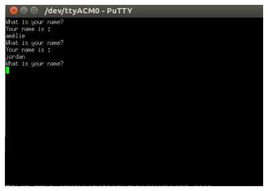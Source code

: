 \documentclass{article}
\begin{document}
\begin{figure}[H]
\begin{center}
\advance\leftskip-3cm
\advance\rightskip-3cm
\includegraphics[keepaspectratio=true,scale=0.5]{whatisyourname.png}

\label{visina8}
\end{center}\end{figure}
\end{document}
